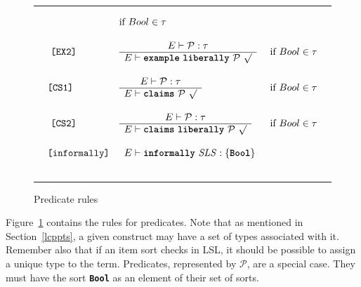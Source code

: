 \documentclass[12pt]{article} %
\newcommand{\reserved}[1]{\textbf{\texttt{#1}}} %
\newcommand{\RULELAB}[1]{\texttt{#1}}
\newcommand{\UNSPACEFORBOX}{\vspace{-2ex}}
\newcommand{\HLINE}{\UNSPACEFORBOX%
\begin{flushleft}\rule{\textwidth}{0.01in}\end{flushleft}%
\UNSPACEFORBOX}
\newenvironment{BFIGURE}{

\begin{figure}
\small
\HLINE
}{
\HLINE
\normalsize
\end{figure}
}
\begin{document}
\begin{BFIGURE}
\begin{displaymath}
\begin{array}{llc}
&
\mbox{if $Bool \in \tau$}
\\
~\\\
\RULELAB{[EX2]} &
\begin{array}{c}
E \vdash \mathcal{P}: \tau\\
\hline
E \vdash \mbox{\reserved{example} \reserved{liberally} }\mathcal{P}~ \surd
\end{array}
&
\mbox{if $Bool \in \tau$}
\\
~\\
\RULELAB{[CS1]} &
\begin{array}{c}
E \vdash \mathcal{P}: \tau\\
\hline
E \vdash \mbox{\reserved{claims} }\mathcal{P}~ \surd
\end{array}
&
\mbox{if $Bool \in \tau$}
\\
~\\\
\RULELAB{[CS2]} &
\begin{array}{c}
E \vdash \mathcal{P}: \tau\\
\hline
E \vdash \mbox{\reserved{claims} \reserved{liberally} }\mathcal{P}~ \surd
\end{array}
&
\mbox{if $Bool \in \tau$}
\\
~\\
\RULELAB{[informally]} &
\begin{array}{c}
E \vdash \mbox{\reserved{informally} \textit{SLS}} : \{\reserved{Bool}\}
\end{array}
\\
~\\
\end{array}
\end{displaymath}
\caption{Predicate rules}
\label{fig-two}
\end{BFIGURE}
Figure~\ref{fig-two} contains the rules for predicates. Note that as
mentioned in Section~\ref{lcppts}, a given construct may have a set of
types associated with it. Remember also that if an item sort checks in
LSL, it should be possible to assign a unique type to the
term. Predicates, represented by $\mathcal{P}$, are a special
case. They must have the sort \reserved{Bool} as an element of their
set of sorts.
\end{document}
